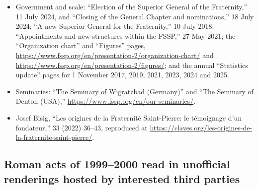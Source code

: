 \begin{itemize}
\item Government and scale: ``Election of the Superior General of the
Fraternity,'' 11 July 2024, and ``Closing of the General Chapter and
nominations,'' 18 July 2024; ``A new Superior General for the
Fraternity,'' 10 July 2018; ``Appointments and new structures within the
FSSP,'' 27 May 2021; the ``Organization chart'' and ``Figures'' pages,
\url{https://www.fssp.org/en/presentation-2/organization-chart/} and
\url{https://www.fssp.org/en/presentation-2/figures/}; and
the annual ``Statistics update'' pages for 1 November 2017, 2019, 2021,
2023, 2024 and 2025.
\item Seminaries: ``The Seminary of Wigratzbad (Germany)''
and ``The Seminary of Denton (USA),''
\url{https://www.fssp.org/en/our-seminaries/}.
\item Josef Bisig, ``Les origines de la Fraternité Saint-Pierre: le
témoignage d'un fondateur,''  33 (2022) 36--43,
reproduced at \url{https://claves.org/les-origines-de-la-fraternite-saint-pierre/}.
\end{itemize}

\subsection*{Roman acts of 1999--2000 read in unofficial renderings hosted
by interested third parties}


